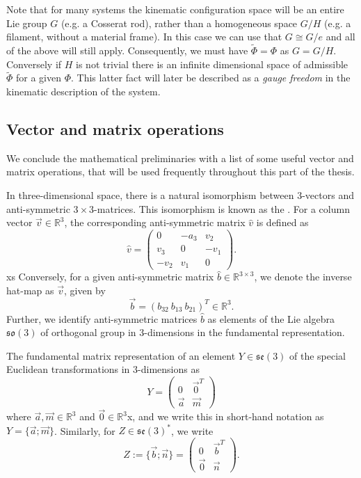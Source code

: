 Note that for many systems the kinematic configuration space will be an entire Lie group $G$ (e.g. a Cosserat rod), rather than a homogeneous space $G/H$ (e.g. a filament, without a material frame). In this case we can use that $G \cong G / e$ and all of the above will still apply. Consequently, we must have $\tilde{\Phi} = \Phi$ as $G = G/H$. Conversely if $H$ is not trivial there is an infinite dimensional space of admissible $\tilde{\Phi}$ for a given $\Phi$. This latter fact will later be described as a \textit{gauge freedom} in the kinematic description of the system.

\subsection{Vector and matrix operations}

We conclude the mathematical preliminaries with a list of some useful vector and matrix operations, that will be used frequently throughout this part of the thesis. 

In three-dimensional space, there is a natural isomorphism between $3$-vectors and anti-symmetric $3 \times 3$-matrices. This isomorphism is known as the . For a column vector $\vec{v} \in \mathbb{R}^3$, the corresponding anti-symmetric matrix $\hat{v}$ is defined as
\begin{equation} \label{eq:hat map}
\hat{v} =  \begin{pmatrix}
0 & -a_3 & v_2 \\
v_3 & 0 & - v_1 \\
- v_2 & v_1 & 0
\end{pmatrix}.
\end{equation}xs
Conversely, for a given anti-symmetric matrix $\hat{b} \in \mathbb{R}^{3 \times 3}$, we denote the inverse hat-map as $\vec{v}$, given by
\begin{equation}
	\vec{b} = (b_{32}\ b_{13}\ b_{21})^T \in \mathbb{R}^3.
\end{equation}
Further, we identify anti-symmetric matrices $\hat{b}$ as elements of the Lie algebra $\mathfrak{so}(3)$ of orthogonal group in $3$-dimensions in the fundamental representation.

The fundamental matrix representation of an element $Y \in \mathfrak{se}(3)$ of the special Euclidean transformations in $3$-dimensions as
\begin{equation}
	Y = \begin{pmatrix}
		0 & \vec{0}^T \\
		\vec{a} & \vec{m}
	\end{pmatrix}
\end{equation}
where $\vec{a}, \vec{m} \in \mathbb{R}^3$ and $\vec{0} \in \mathbb{R}^3$x, and we write this in short-hand notation as $Y = \{ \vec{a} ; \vec{m} \}$. Similarly, for $Z \in \mathfrak{se}(3)^*$, we write
\begin{equation}
	Z := \{ \vec{b} ; \vec{n} \} = \begin{pmatrix}
		0 & \vec{b}^T \\
		\vec{0} & \vec{n}
	\end{pmatrix}.
\end{equation}

